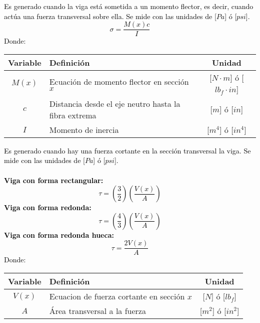 \documentclass[letterpaper,11pt]{extarticle}
\newcommand{\mybox}[2]
{
    \begin{tcolorbox}[colback=color!5!white,colframe=color!75!black,boxsep=1pt,arc=0pt,outer arc=0pt,title={\textcolor{white}{#1}}]
        \textcolor{black}{#2}
    \end{tcolorbox}
}
\begin{document}
\begin{multicols}{2}
        \mybox{Esfuerzo normal:}
        {
            Es generado cuando la viga está sometida a un momento flector, es decir, cuando actúa una fuerza transversal sobre ella. Se mide con las unidades de [$Pa$] ó [$psi$]. \\ 
            \begin{equation}
                \sigma = \frac{M(x)c}{I}
            \end{equation}
            Donde:
            \begin{center}
                \begin{tabular}{ c | p{25mm} | c }
                    \hline Variable & Definición & Unidad \\ \hline 
                    $M(x)$ & Ecuación de momento flector en sección $x$ & [$N \cdot m$] ó [$lb_f\cdot in$]\\
                    $c$ & Distancia desde el eje neutro hasta la fibra extrema & [$m$] ó [$in$]\\
                    $I$ & Momento de inercia & [$m^4$] ó [$in^4$]\\ \hline
                \end{tabular}
            \end{center}
        }

        \mybox{Esfuerzo cortante:}
        {
            Es generado cuando hay una fuerza cortante en la sección transversal la viga. Se mide con las unidades de [$Pa$] ó [$psi$]. \\\\
            \textbf{Viga con forma rectangular:}
            \begin{equation}
                \tau = \left(\frac{3}{2}\right)\left(\frac{V(x)}{A}\right)
            \end{equation}
            \textbf{Viga con forma redonda:}
            \begin{equation}
                \tau = \left(\frac{4}{3}\right)\left(\frac{V(x)}{A}\right)
            \end{equation}
            \textbf{Viga con forma redonda hueca:}
            \begin{equation}
                \tau = \frac{2V(x)}{A}
            \end{equation}
            Donde:
            \begin{center}
                \begin{tabular}{ c | p{35mm} | c }
                    \hline Variable & Definición & Unidad \\ \hline 
                    $V(x)$ & Ecuacion de fuerza cortante en sección $x$ & [$N$] ó [$lb_f$]\\
                    $A$ & Área transversal a la fuerza & [$m^2$] ó [$in^2$]\\ \hline
                \end{tabular}
            \end{center}
        }


\end{multicols}
\end{document}
